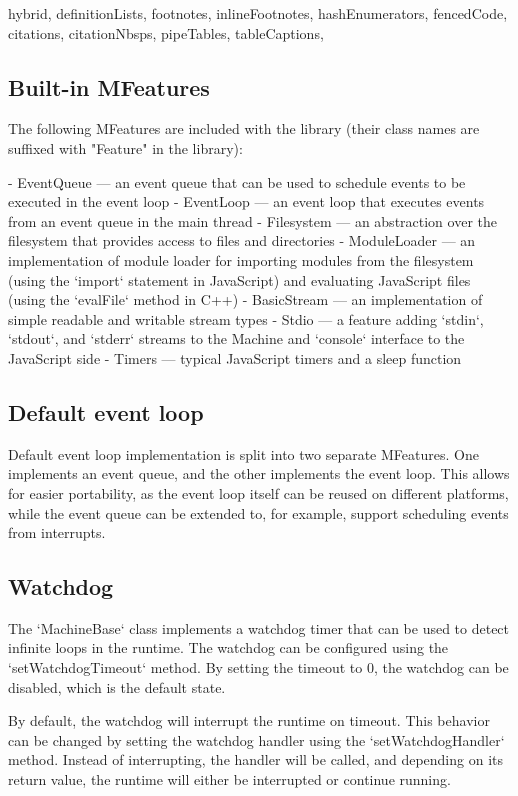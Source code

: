 \begin{markdown*}{%
  hybrid,
  definitionLists,
  footnotes,
  inlineFootnotes,
  hashEnumerators,
  fencedCode,
  citations,
  citationNbsps,
  pipeTables,
  tableCaptions,
}
\subsection{Built-in MFeatures}

The following MFeatures are included with the library (their class names are suffixed with "Feature" in the library):

  - EventQueue --- an event queue that can be used to schedule events to be executed in the event loop
  - EventLoop --- an event loop that executes events from an event queue in the main thread
  - Filesystem --- an abstraction over the filesystem that provides access to files and directories
  - ModuleLoader --- an implementation of module loader for importing modules from the filesystem (using the `import` statement in JavaScript) and evaluating JavaScript files (using the `evalFile` method in C++)
  - BasicStream --- an implementation of simple readable and writable stream types
  - Stdio --- a feature adding `stdin`, `stdout`, and `stderr` streams to the Machine and `console` interface to the JavaScript side
  - Timers --- typical JavaScript timers and a sleep function

\subsection{Default event loop}

Default event loop implementation is split into two separate MFeatures. One implements an event queue, and the other implements the event loop. This allows for easier portability, as the event loop itself can be reused on different platforms, while the event queue can be extended to, for example, support scheduling events from interrupts.

\subsection{Watchdog}

The `MachineBase` class implements a watchdog timer that can be used to detect infinite loops in the runtime. The watchdog can be configured using the `setWatchdogTimeout` method. By setting the timeout to 0, the watchdog can be disabled, which is the default state.

By default, the watchdog will interrupt the runtime on timeout. This behavior can be changed by setting the watchdog handler using the `setWatchdogHandler` method. Instead of interrupting, the handler will be called, and depending on its return value, the runtime will either be interrupted or continue running.


\end{markdown*}
